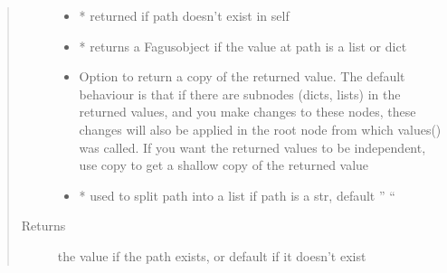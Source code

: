 \documentclass[a4paper,10pt,english]{sphinxmanual}
\begin{document}
\begin{fulllineitems}
\begin{fulllineitems}
\begin{quote}
\begin{description}
\begin{itemize}
\item {}
\sphinxAtStartPar
{} \textendash{} * returned if path doesn’t exist in self

\item {}
\sphinxAtStartPar
{} \textendash{} * returns a Fagus\sphinxhyphen{}object if the value at path is a list or dict

\item {}
\sphinxAtStartPar
{} \textendash{} Option to return a copy of the returned value. The default behaviour is that if there are subnodes
(dicts, lists) in the returned values, and you make changes to these nodes, these changes will also be
applied in the root node from which values() was called. If you want the returned values to be
independent, use copy to get a shallow copy of the returned value

\item {}
\sphinxAtStartPar
{} \textendash{} * used to split path into a list if path is a str, default ” “

\end{itemize}

\item[{Returns}] \leavevmode
\sphinxAtStartPar
the value if the path exists, or default if it doesn’t exist

\end{description}\end{quote}

\end{fulllineitems}



\end{fulllineitems}
\end{document}
